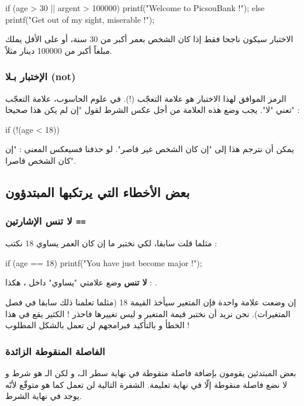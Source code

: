 \begin{Csource}
if (age > 30 || argent > 100000)
{
	printf("Welcome to PicsouBank !");
}
else
{
	printf("Get out of my sight, miserable !");
}
\end{Csource}

الاختبار سيكون ناجحا فقط إذا كان الشخص بعمر أكبر من 30 سنة، أو على الأقل يملك مبلغاً أكبر من 100000 دينار مثلاً.

\subsubsection{الإختبار بـلا (\textenglish{not})}

الرمز الموافق لهذا الاختبار هو علامة التعجّب (!). في علوم الحاسوب، علامة التعجّب تعني "لا". يجب  وضع هذه العلامة من أجل عكس الشرط لقول  "إن لم يكن هذا صحيحا" :
\begin{Csource}
if (!(age < 18))
\end{Csource}

يمكن أن نترجم هذا إلى "إن كان الشخص غير قاصر". لو حذفنا
\InlineCode{!}
فسيعكس المعنى : "إن كان الشخص قاصرا".
\subsection{بعض الأخطاء التي يرتكبها المبتدؤون}

\subsubsection{لا تنس الإشارتين \texttt{==}}

مثلما قلت سابقا، لكي نختبر ما إن كان العمر يساوي 18 نكتب :

\begin{Csource}
if (age == 18)
{
	printf("You have just become major !");
}
\end{Csource}

\textbf{لا تنس}
وضع علامتي "يساوي" داخل
،
هكذا :
\InlineCode{==}.

إن وضعت علامة
\InlineCode{=}
واحدة فإن المتغير
سيأخذ القيمة 18 (مثلما تعلمنا ذلك سابقا في فصل المتغيرات). نحن نريد أن نختبر قيمة المتغير و ليس تغييرها فاحذر ! الكثير يقع في هذا الخطأ و بالتأكيد فبرامجهم لن تعمل بالشكل المطلوب !

\subsubsection{الفاصلة المنقوطة الزائدة}

بعض المبتدئين يقومون بإضافة فاصلة منقوطة في نهاية سطر الـ، و لكن الـ هو شرط و لا نضع فاصلة منقوطة إلّا في نهاية تعليمة. الشفرة التالية لن تعمل كما هو متوقّع لأنّه يوجد
\InlineCode{;}
في نهاية الشرط.

